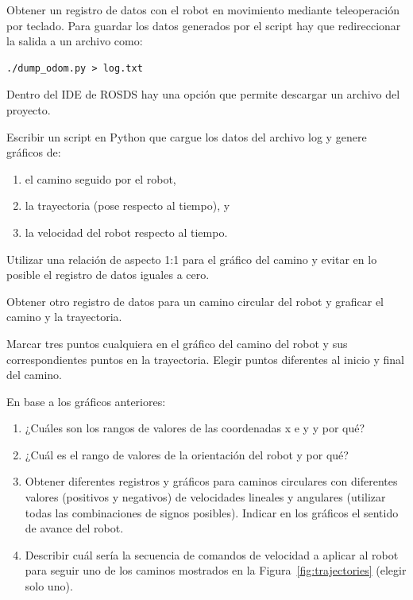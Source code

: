 \documentclass[tp]{lcc}
\begin{document}
\ejercicio Obtener un registro de datos con el robot en movimiento mediante teleoperación por teclado. Para guardar los datos generados por el script hay que redireccionar la salida a un archivo como:

\begin{lstlisting}[style=bash] 
./dump_odom.py > log.txt
\end{lstlisting}

Dentro del IDE de ROSDS hay una opción que permite descargar un archivo del proyecto.

\ejercicio Escribir un script en Python que cargue los datos del archivo log y genere gráficos de:
\begin{enumerate}
	\item el camino seguido por el robot,
	\item la trayectoria (pose respecto al tiempo), y
	\item la velocidad del robot respecto al tiempo.
\end{enumerate} 

\nota Utilizar una relación de aspecto 1:1 para el gráfico del camino y evitar en lo posible el registro de datos iguales a cero.

\ejercicio Obtener otro registro de datos para un camino circular del robot y graficar el camino y la trayectoria.

\ejercicio Marcar tres puntos cualquiera en el gráfico del camino del robot y sus correspondientes puntos en la trayectoria. Elegir puntos diferentes al inicio y final del camino.


En base a los gráficos anteriores:

\begin{enumerate}

\item ¿Cuáles son los rangos de valores de las coordenadas x e y y por qué?

\item  ¿Cuál es el rango de valores de la orientación del robot y por qué?

\item Obtener diferentes registros y gráficos para caminos circulares con diferentes valores (positivos y negativos) de velocidades lineales y angulares (utilizar todas las combinaciones de signos posibles). Indicar en los gráficos el sentido de avance del robot.

\item Describir cuál sería la secuencia de comandos de velocidad a aplicar al robot para seguir uno de los caminos mostrados en la Figura~\ref{fig:trajectories} (elegir solo uno).

\end{enumerate}
\end{document}
